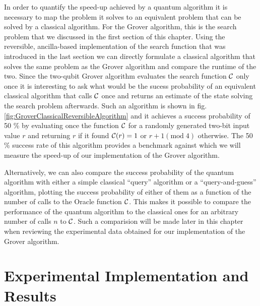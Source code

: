 In order to quantify the speed-up achieved by a quantum algorithm it is necessary to map the problem it solves to an equivalent problem that can be solved by a classical algorithm. For the Grover algorithm, this is the search problem that we discussed in the first section of this chapter. Using the reversible, ancilla-based implementation of the search function that was introduced in the last section we can directly formulate a classical algorithm that solves the same problem as the Grover algorithm and compare the runtime of the two. Since the two-qubit Grover algorithm evaluates the search function $\Or$ only once it is interesting to ask what would be the sucess probability of an equivalent classical algorithm that calls $\Or$ once and returns an estimate of the state solving the search problem afterwards. Such an algorithm is shown in fig. \ref{fig:GroverClassicalReversibleAlgorithm} and it achieves a success probability of 50 \% by evaluating once the function $\Or$ for a randomly generated two-bit input value $r$ and returning $r$ if it found $\Or(r)=1$ or $r+1(\mathrm{mod}\;4)$ otherwise. The 50 \% success rate of this algorithm provides a benchmark against which we will measure the speed-up of our implementation of the Grover algorithm.

\smallskip

Alternatively, we can also compare the success probability of the quantum algorithm with either a simple classical ``query'' algorithm or a ``query-and-guess'' algorithm, plotting the success probability of either of them as a function of the number of calls to the Oracle function $\Or$. This makes it possible to compare the performance of the quantum algorithm to the classical ones for an arbitrary number of calls $n$ to $\Or$. Such a comparision will be made later in this chapter when reviewing the experimental data obtained for our implementation of the Grover algorithm.

\section{Experimental Implementation and Results}

